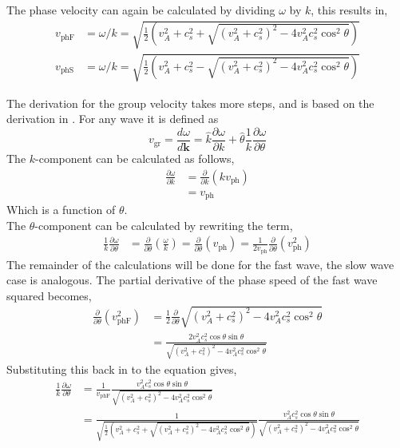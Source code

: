 \documentclass[a4paper]{article}
\begin{document}
The phase velocity can again be calculated by dividing $\omega$ by $k$, this results in,
\begin{equation}\label{eq:phase_velocity}
\begin{split}
    v_{\text{phF}} &= \omega/k = \sqrt{\frac{1}{2}\left(v_A^2 + c_s^2 + \sqrt{(v_A^2 + c_s^2)^2 - 4v_A^2c_s^2\cos^2\theta}\right)}\\
    v_{\text{phS}} &= \omega/k = \sqrt{\frac{1}{2}\left(v_A^2 + c_s^2 - \sqrt{(v_A^2 + c_s^2)^2 - 4v_A^2c_s^2\cos^2\theta}\right)}
\end{split}
\end{equation}

The derivation for the group velocity takes more steps, and is based on the derivation in \cite{Lyu2014}. For any wave it is defined as 
\begin{equation*}
    v_{\text{gr}} = \frac{d\omega}{d\mathbf{k}} = \hat{k}\frac{\partial\omega}{\partial k} + \hat{\theta} \frac{1}{k}\frac{\partial\omega}{\partial\theta}
\end{equation*}
The $k$-component can be calculated as follows,
\begin{align*}
    \frac{\partial \omega}{\partial k} &= \frac{\partial}{\partial k}\left(kv_{\text{ph}}\right)\\
    &= v_{\text{ph}}
\end{align*}
Which is a function of $\theta$.\\
The $\theta$-component can be calculated by rewriting the term,
\begin{align*}
    \frac{1}{k}\frac{\partial \omega}{\partial \theta} &= \frac{\partial}{\partial \theta}\left(\frac{\omega}{k}\right)
    = \frac{\partial}{\partial \theta}(v_{\text{ph}}) = \frac{1}{2v_{\text{ph}}} \frac{\partial}{\partial \theta}(v^2_{\text{ph}})
\end{align*}
The remainder of the calculations will be done for the fast wave, the slow wave case is analogous. The partial derivative of the phase speed of the fast wave squared becomes,
\begin{align*}
     \frac{\partial}{\partial \theta}(v^2_{\text{phF}})&= \frac{1}{2}\frac{\partial}{\partial \theta} \sqrt{(v_A^2 + c_s^2)^2 - 4v_A^2c_s^2\cos^2\theta}\\
     &= \frac{2v_A^2c_s^2\cos\theta\sin\theta}{\sqrt{(v_A^2 + c_s^2)^2 - 4v_A^2c_s^2\cos^2\theta}}
\end{align*}
Substituting this back in to the equation gives,
\begin{align*}
     \frac{1}{k}\frac{\partial \omega}{\partial \theta} &= \frac{1}{v_{\text{phF}}}  \frac{v_A^2c_s^2\cos\theta\sin\theta}{\sqrt{(v_A^2 + c_s^2)^2 - 4v_A^2c_s^2\cos^2\theta}}\\
     &= \frac{1}{\sqrt{\frac{1}{2}\left(v_A^2 + c_s^2 + \sqrt{(v_A^2 + c_s^2)^2 - 4v_A^2c_s^2\cos^2\theta}\right)}}\frac{v_A^2c_s^2\cos\theta\sin\theta}{\sqrt{(v_A^2 + c_s^2)^2 - 4v_A^2c_s^2\cos^2\theta}}
\end{align*}
\end{document}
